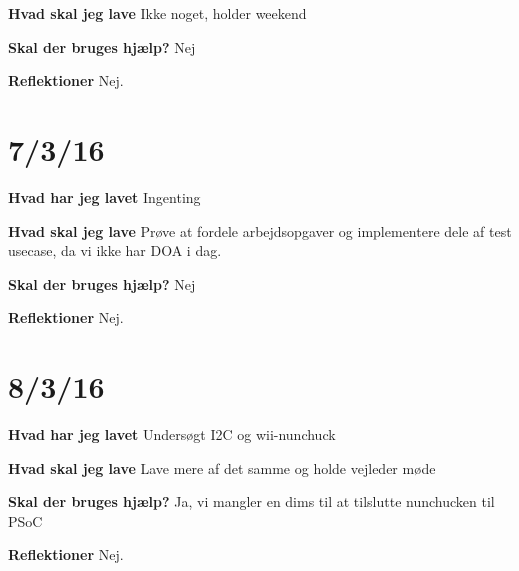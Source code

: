 \documentclass{article}
\begin{document}
	\textbf{Hvad skal jeg lave}
	Ikke noget, holder weekend
	
	\textbf{Skal der bruges hjælp?}
	Nej
	
	\textbf{Reflektioner}
	Nej.	
	
	\section{7/3/16}
	\textbf{Hvad har jeg lavet}
	Ingenting
	
	\textbf{Hvad skal jeg lave}
	Prøve at fordele arbejdsopgaver og implementere dele af test usecase, da vi ikke har DOA i dag.
	
	\textbf{Skal der bruges hjælp?}
	Nej
	
	\textbf{Reflektioner}
	Nej.
	
	\section{8/3/16}
	\textbf{Hvad har jeg lavet}
	Undersøgt I2C og wii-nunchuck 
	
	\textbf{Hvad skal jeg lave}
	Lave mere af det samme og holde vejleder møde
	
	\textbf{Skal der bruges hjælp?}
	Ja, vi mangler en dims til at tilslutte nunchucken til PSoC 
	
	\textbf{Reflektioner}
	Nej.	
\end{document}
